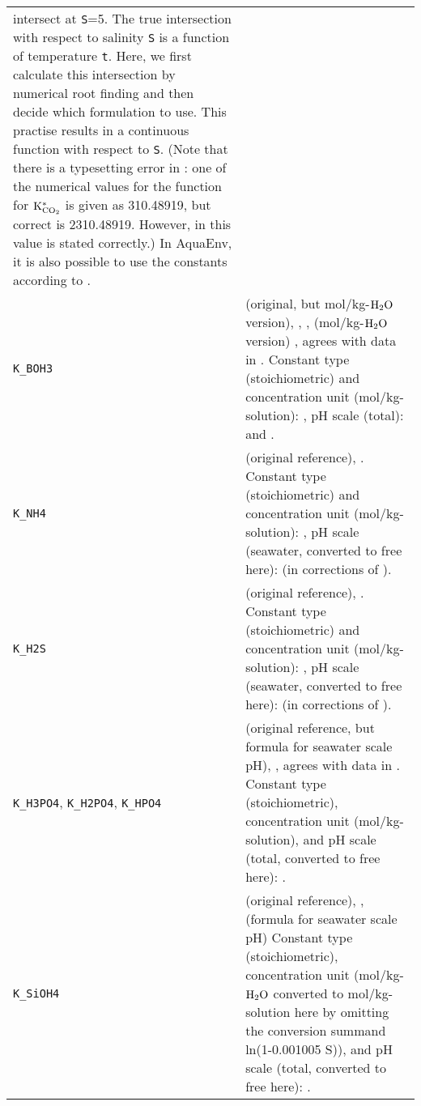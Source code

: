 \documentclass[article,nojss]{jss}
\begin{document}
\begin{footnotesize}
\begin{longtable}{p{}|p{}}
intersect at \texttt{S}=5. The true intersection with respect to salinity \texttt{S} is a function of temperature \texttt{t}. Here, we first calculate this intersection by
numerical root finding and then decide which formulation to use. This practise results in a continuous function with respect to \texttt{S}. (Note that there is a typesetting error in \citet{Roy1993b}: one of the numerical values for the function for $\rm K^*_{CO_2}$ is given as 310.48919, but correct is 2310.48919. However, in \citet{Millero1995} this value is stated correctly.) In \textsf{AquaEnv}, it is also possible to use the constants according to \cite{Lueker2000}.\\
\texttt{K\_BOH3}     & \citet[p. 763]{Dickson1990} (original, but mol/kg-$\rm H_2O$ version), \citet[ch. 5, p. 14]{DOE1994}, \citet[p. 262]{Zeebe2001}, \citet[p.669]{Millero1995} (mol/kg-$\rm H_2O$ version) , agrees with data in \citet{Roy1993a}.
Constant type (stoichiometric) and  concentration unit (mol/kg-solution): \citet[chapter 5, p. 14]{DOE1994}, pH scale (total): \citet[chapter 5, p. 12]{DOE1994} and \citet[p.263]{Zeebe2001}. \\
\texttt{K\_NH4}      & \citet{Millero1995a} (original reference), \citet[p.671]{Millero1995}. Constant type (stoichiometric) and concentration unit (mol/kg-solution): \citet[p.671]{Millero1995}, pH scale (seawater, converted to free here):  
\citet{Lewis1998} (in corrections of \citet{Millero1995}).\\
\texttt{K\_H2S}      & \citet{Millero1988} (original reference), \citet[p.671]{Millero1995}. Constant type (stoichiometric) and concentration unit (mol/kg-solution): \citet[p.671]{Millero1995}, pH scale (seawater, converted to free here):  
\citet{Lewis1998} (in corrections of \citet{Millero1995}).\\
\texttt{K\_H3PO4}, \texttt{K\_H2PO4}, \texttt{K\_HPO4} & \citet[p.670]{Millero1995} (original reference, but formula for seawater scale pH), \citet[ch. 5, p 16,17]{DOE1994}, agrees with data in \citet{Dickson1979a}.
 Constant type (stoichiometric), concentration unit (mol/kg-solution), and pH scale (total, converted to free here): \citet[chapter 5, p. 12, 16, 17]{DOE1994}.\\
\texttt{K\_SiOH4}    & \citet{Millero1988} (original reference), \citet[chapter 5, p 17]{DOE1994}, \citet[p.671]{Millero1995} (formula for seawater scale pH)
 Constant type (stoichiometric), concentration unit (mol/kg-$\rm H_2O$ converted to mol/kg-solution here by omitting the conversion summand ln(1-0.001005 S)), and pH scale (total, converted to free here): \citet[chapter 5, p. 12, 17]{DOE1994}.\\

\end{longtable}
\end{footnotesize}
\end{document}
